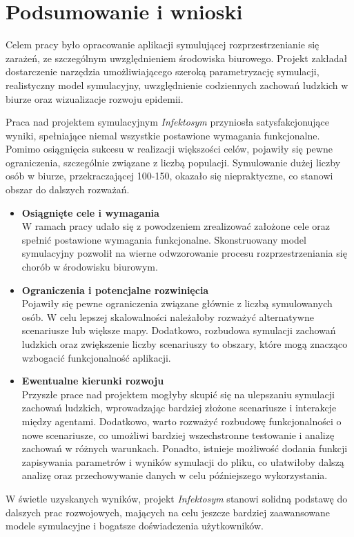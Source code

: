 \chapter*{Podsumowanie i wnioski}
\label{Podsumowanie i wnioski}
Celem pracy było opracowanie aplikacji symulującej rozprzestrzenianie się zarażeń, ze szczególnym uwzględnieniem środowiska biurowego. Projekt zakładał dostarczenie narzędzia umożliwiającego szeroką parametryzację symulacji, realistyczny model symulacyjny, uwzględnienie codziennych zachowań ludzkich w biurze oraz wizualizacje rozwoju epidemii.

Praca nad projektem symulacyjnym \textit{Infektosym} przyniosła satysfakcjonujące wyniki, spełniające niemal wszystkie postawione wymagania funkcjonalne. Pomimo osiągnięcia sukcesu w realizacji większości celów, pojawiły się pewne ograniczenia, szczególnie związane z liczbą populacji. Symulowanie dużej liczby osób w biurze, przekraczającej 100-150, okazało się niepraktyczne, co stanowi obszar do dalszych rozważań.

\begin{itemize}
	\item \textbf{Osiągnięte cele i wymagania} \\
	 W ramach pracy udało się z powodzeniem zrealizować założone cele oraz spełnić postawione wymagania funkcjonalne. Skonstruowany model symulacyjny pozwolił na wierne odwzorowanie procesu rozprzestrzeniania się chorób w środowisku biurowym.
	
	\item \textbf{Ograniczenia i potencjalne rozwinięcia} \\
	 Pojawiły się pewne ograniczenia związane głównie z liczbą symulowanych osób. W celu lepszej skalowalności należałoby rozważyć alternatywne scenariusze lub większe mapy. Dodatkowo, rozbudowa symulacji zachowań ludzkich oraz zwiększenie liczby scenariuszy to obszary, które mogą znacząco wzbogacić funkcjonalność aplikacji.
	
	\item \textbf{Ewentualne kierunki rozwoju} \\
	 Przyszłe prace nad projektem mogłyby skupić się na ulepszaniu symulacji zachowań ludzkich, wprowadzając bardziej złożone scenariusze i interakcje między agentami. Dodatkowo, warto rozważyć rozbudowę funkcjonalności o nowe scenariusze, co umożliwi bardziej wszechstronne testowanie i analizę zachowań w różnych warunkach. Ponadto, istnieje możliwość dodania funkcji zapisywania parametrów i wyników symulacji do pliku, co ułatwiłoby dalszą analizę oraz przechowywanie danych w celu późniejszego wykorzystania.
\end{itemize}

W świetle uzyskanych wyników, projekt \textit{Infektosym} stanowi solidną podstawę do dalszych prac rozwojowych, mających na celu jeszcze bardziej zaawansowane modele symulacyjne i bogatsze doświadczenia użytkowników. 
